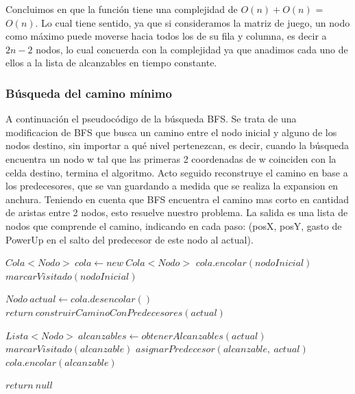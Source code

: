  \vspace{2mm}

Concluimos en que la funci\'on tiene una complejidad de $O(n) + O(n)$ = $O(n)$. Lo cual tiene sentido, ya que si consideramos la matriz de juego, un nodo como m\'aximo puede moverse hacia todos los de su fila y columna, es decir a $2n - 2$ nodos, lo cual concuerda con la complejidad ya que anadimos cada uno de ellos a la lista de alcanzables en tiempo constante.

\subsubsection{B\'usqueda del camino m\'inimo}

A continuaci\'on el pseudoc\'odigo de la b\'usqueda BFS. Se trata de una modificacion de BFS que busca un camino entre el nodo inicial y alguno de los nodos destino, sin importar a qu\'e nivel pertenezcan, es decir, cuando la b\'usqueda encuentra un nodo w tal que las primeras 2 coordenadas de w coinciden con la celda destino, termina el algoritmo. Acto seguido reconstruye el camino en base a los predecesores, que se van guardando a medida que se realiza la expansion en anchura. Teniendo en cuenta que BFS encuentra el camino mas corto en cantidad de aristas entre 2 nodos, esto resuelve nuestro problema. La salida es una lista de nodos que comprende el camino, indicando en cada paso: (posX, posY, gasto de PowerUp en el salto del predecesor de este nodo al actual).

\vspace{2mm}
\begin{algorithmic}[1]

	\State$Cola<Nodo>\: cola \gets new \:Cola<Nodo>$
	\State$cola.encolar(nodoInicial)$
	\State$marcarVisitado(nodoInicial)$
	
		\State $Nodo \:actual \gets cola.desencolar()$
			\State $return \: construirCaminoConPredecesores(actual)$

		\EndIf
			
		\State $Lista<Nodo> \: alcanzables \gets obtenerAlcanzables(actual)$
			\Comment				
				\State$marcarVisitado(alcanzable)$
				\State$	asignarPredecesor(alcanzable,\: actual)$
				\State$	cola.encolar(alcanzable)$	
			\EndIf
			
		\EndFor
		\EndWhile
		\State $return\: null$

\EndProcedure
\end{algorithmic}
\vspace{2mm}

